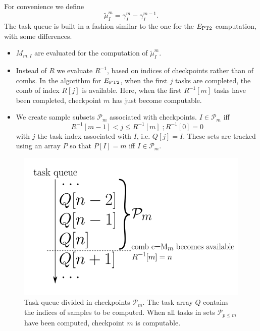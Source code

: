 \documentclass[./thesis.tex]{subfiles}
\begin{document}
For convenience we define
\begin{equation}
\tilde \mu^m_I = \gamma^m_I - \gamma^{m-1}_I.
\end{equation}
The task queue is built in a fashion similar to the one for the $E_\text{PT2}$ computation, with some differences.
\begin{itemize}
\item
$M_{m,I}$ are evaluated for the computation of $\tilde \mu^m_I$.
\item
Instead of $R$ we evaluate $R^{-1}$, based on indices of checkpoints rather than of combs. In the algorithm for $E_\text{PT2}$, when the first $j$ tasks are completed, the comb of index $R[j]$ is available. Here, when the first $R^{-1}[m]$ tasks have been completed, checkpoint $m$ has just become computable.
\item
We create sample subsets $\mathcal{P}_m$ associated with checkpoints. $I \in \mathcal{P}_m$ iff
\begin{equation}
R^{-1}[m-1] < j \leq R^{-1}[m]  \;; R^{-1}[0] = 0
\end{equation}
with $j$ the task index associated with $I$, i.e. $Q[j]=I$. These sets are tracked using an array $P$ so that $P[I]=m$ iff $I \in \mathcal{P}_m$.

\end{itemize}

\begin{figure}[h!]
	\begin{center}
		\includegraphics[width=0.45\columnwidth]{figures/matrix_dressing/taskqueue}
		\caption{Task queue divided in checkpoints $\mathcal{P}_m$. The task array $Q$ contains the indices of samples to be computed. When all tasks in sets $\mathcal{P}_{p\leq m}$ have been computed, checkpoint $m$ is computable.
}
		\label{fig:task_queue}
	\end{center}
\end{figure}
\end{document}
